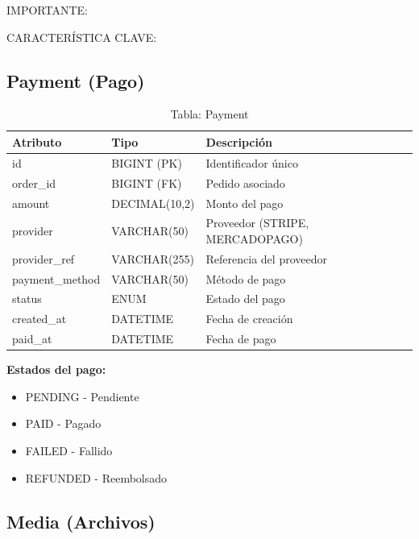 \documentclass[12pt,a4paper,oneside]{book}
\begin{document}
\begin{alert}{IMPORTANTE:}
\begin{info}{CARACTERÍSTICA CLAVE:}
\subsection{Payment (Pago)}
\label{sec:payment}

\begin{table}[ht]
    \centering
    \caption{Tabla: Payment}
    \begin{tabular}{@{}lll@{}}
        \toprule
        \textbf{Atributo} & \textbf{Tipo} & \textbf{Descripción} \\
        \midrule
        id & BIGINT (PK) & Identificador único \\
        order\_id & BIGINT (FK) & Pedido asociado \\
        amount & DECIMAL(10,2) & Monto del pago \\
        provider & VARCHAR(50) & Proveedor (STRIPE, MERCADOPAGO) \\
        provider\_ref & VARCHAR(255) & Referencia del proveedor \\
        payment\_method & VARCHAR(50) & Método de pago \\
        status & ENUM & Estado del pago \\
        created\_at & DATETIME & Fecha de creación \\
        paid\_at & DATETIME & Fecha de pago \\
        \bottomrule
    \end{tabular}
\end{table}

\textbf{Estados del pago:}
\begin{itemize}
    \item PENDING - Pendiente
    \item PAID - Pagado
    \item FAILED - Fallido
    \item REFUNDED - Reembolsado
\end{itemize}

\subsection{Media (Archivos)}
\label{sec:media}


\end{info}
\end{alert}
\end{document}
